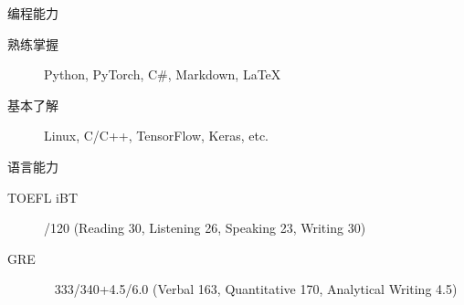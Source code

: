 \documentclass{resume} %
\begin{document}

\begin{rSection}{编程能力}

\begin{description}
    \item[熟练掌握] \quad\quad Python, PyTorch, C\#, Markdown, \LaTeX
    \item[基本了解] \quad\quad Linux, C/C++, TensorFlow, Keras, etc.
\end{description}

\end{rSection}

\begin{rSection}{语言能力}

\begin{description}
    \item[TOEFL iBT] /120 \quad (Reading 30, Listening 26, Speaking 23, Writing 30)
    \item[GRE] \quad\quad\quad\quad\,\,\, 333/340+4.5/6.0 (Verbal 163, Quantitative 170, Analytical Writing 4.5)%
\end{description}

\end{rSection}
\end{document}

